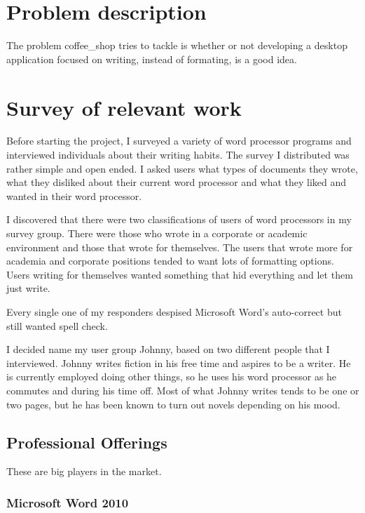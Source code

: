 \documentclass[11pt]{article}
\begin{document}
\section{Problem description}

The problem coffee\_shop tries to tackle is whether or not developing a desktop application focused on writing, instead of formating, is a good idea.

\section{Survey of relevant work}

Before starting the project, I surveyed a variety of word processor programs and interviewed individuals about their writing habits. The survey I distributed was rather simple and open ended. I asked users what types of documents they wrote, what they disliked about their current word processor and what they liked and wanted in their word processor.

I discovered that there were two classifications of users of word processors in my survey group. There were those who wrote in a corporate or academic environment and those that wrote for themselves. The users that wrote more for academia and corporate positions tended to want lots of formatting options. Users writing for themselves wanted something that hid everything and let them just write.

Every single one of my responders despised Microsoft Word's auto-correct but still wanted spell check.

I decided name my user group Johnny, based on two different people that I interviewed. Johnny writes fiction in his free time and aspires to be a writer. He is currently employed doing other things, so he uses his word processor as he commutes and during his time off. Most of what Johnny writes tends to be one or two pages, but he has been known to turn out novels depending on his mood.

\subsection{Professional Offerings}

These are big players in the market.

\subsubsection{Microsoft Word 2010}
\end{document}
